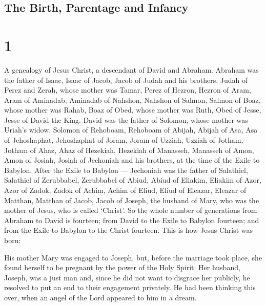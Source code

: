 \hypertarget{the-birth-parentage-and-infancy}{%
\subsection{The Birth, Parentage and
Infancy}\label{the-birth-parentage-and-infancy}}

\hypertarget{section}{%
\section{1}\label{section}}

 A genealogy of Jesus Christ, a descendant of David and
Abraham.  Abraham was the father of Isaac, Isaac of Jacob,
Jacob of Judah and his brothers,  Judah of Perez and Zerah,
whose mother was Tamar, Perez of Hezron, Hezron of Aram, 
Aram of Aminadab, Aminadab of Nahshon, Nahshon of Salmon, 
Salmon of Boaz, whose mother was Rahab, Boaz of Obed, whose mother was
Ruth, Obed of Jesse,  Jesse of David the King. David was the
father of Solomon, whose mother was Uriah's widow,  Solomon
of Rehoboam, Rehoboam of Abijah, Abijah of Asa,  Asa of
Jehoshaphat, Jehoshaphat of Joram, Joram of Uzziah,  Uzziah
of Jotham, Jotham of Ahaz, Ahaz of Hezekiah,  Hezekiah of
Manasseh, Manasseh of Amon, Amon of Josiah,  Josiah of
Jechoniah and his brothers, at the time of the Exile to Babylon.
 After the Exile to Babylon --- Jechoniah was the father of
Salathiel, Salathiel of Zerubbabel,  Zerubbabel of Abiud,
Abiud of Eliakim, Eliakim of Azor,  Azor of Zadok, Zadok of
Achim, Achim of Eliud,  Eliud of Eleazar, Eleazar of
Matthan, Matthan of Jacob,  Jacob of Joseph, the husband of
Mary, who was the mother of Jesus, who is called `Christ'. 
So the whole number of generations from Abraham to David is fourteen;
from David to the Exile to Babylon fourteen; and from the Exile to
Babylon to the Christ fourteen.  This is how Jesus Christ
was born:

His mother Mary was engaged to Joseph, but, before the marriage took
place, she found herself to be pregnant by the power of the Holy Spirit.
 Her husband, Joseph, was a just man and, since he did not
want to disgrace her publicly, he resolved to put an end to their
engagement privately.  He had been thinking this over, when
an angel of the Lord appeared to him in a dream.

